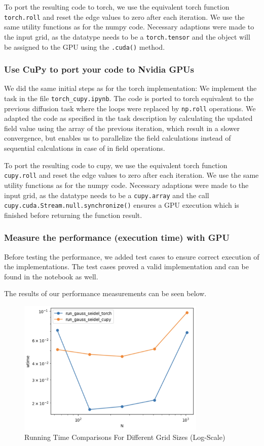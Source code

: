 \documentclass[a4paper,12pt]{article}
\begin{document}
To port the resulting code to torch, we use the equivalent torch function \verb|torch.roll| and reset the edge values to zero after each iteration. We use the same utility functions as for the numpy code.
Necessary adaptions were made to the input grid, as the datatype needs to be a \verb|torch.tensor| and the object will be assigned to the GPU using the \verb|.cuda()| method.

\subsubsection{Use CuPy to port your code to Nvidia GPUs}
We did the same initial steps as for the torch implementation:
We implement the task in the file \verb|torch_cupy.ipynb|. The code is ported to torch equivalent to the previous diffusion task
where the loops were replaced by \verb|np.roll| operations. We adapted the code as specified in the task description by calculating the
updated field value using the array of the previous iteration, which result in a slower convergence, but enables us to parallelize the field calculations
instead of sequential calculations in case of in field operations.

To port the resulting code to cupy, we use the equivalent torch function \verb|cupy.roll| and reset the edge values to zero after each iteration. We use the same utility functions as for the numpy code.
Necessary adaptions were made to the input grid, as the datatype needs to be a \verb|cupy.array| and the call \verb|cupy.cuda.Stream.null.synchronize()| ensures a GPU execution which is finished before returning the function result.

\subsubsection{Measure the performance (execution time) with GPU}
Before testing the performance, we added test cases to ensure correct execution of the implementations.
The test cases proved a valid implementation and can be found in the notebook as well.

The results of our performance measurements can be seen below.
\begin{figure}[H]
  \centering
  \includegraphics[width=0.8\textwidth]{images/cupy_torch_gpu.png}
  \caption{Running Time Comparisons For Different Grid Sizes (Log-Scale)}
\end{figure}
\end{document}
